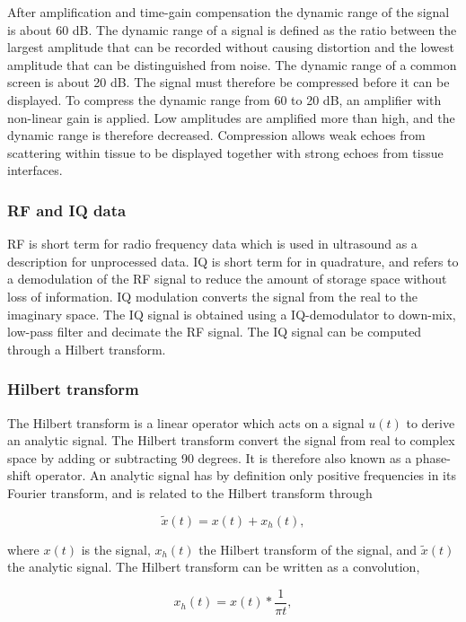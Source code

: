 After amplification and time-gain compensation the dynamic range of the signal is about 60 dB. The dynamic range of a signal is defined as the ratio between the largest amplitude that can be recorded without causing distortion and the lowest amplitude that can be distinguished from noise. The dynamic range of a common screen is about 20 dB. The signal must therefore be compressed before it can be displayed. To compress the dynamic range from 60 to 20 dB, an amplifier with non-linear gain is applied. Low amplitudes are amplified more than high, and the dynamic range is therefore decreased. Compression allows weak echoes from scattering within tissue to be displayed together with strong echoes from tissue interfaces.

\subsubsection{RF and IQ data}
RF is short term for radio frequency data which is used in ultrasound as a description for unprocessed data. IQ is short term for in quadrature, and refers to a demodulation of the RF signal to reduce the amount of storage space without loss of information. IQ modulation converts the signal from the real to the imaginary space. The IQ signal is obtained using a IQ-demodulator to down-mix, low-pass filter and decimate the RF signal. The IQ signal can be computed through a Hilbert transform\cite{Kirkhorn1999}.

\subsubsection{Hilbert transform}
The Hilbert transform is a linear operator which acts on a signal $u(t)$ to derive an analytic signal. The Hilbert transform convert the signal from real to complex space by adding or subtracting 90 degrees. It is therefore also known as a phase-shift operator. An analytic signal has by definition only positive frequencies in its Fourier transform, and is related to the Hilbert transform through 

\begin{equation}
\tilde{x}(t) = x(t) + x_h(t),
\end{equation}

where $x(t)$ is the signal, $x_h(t)$ the Hilbert transform of the signal, and $\tilde{x}(t)$ the analytic signal. The Hilbert transform can be written as a convolution, 

\begin{equation}
x_h(t) = x(t)*\frac{1}{\pi t},
\end{equation}

